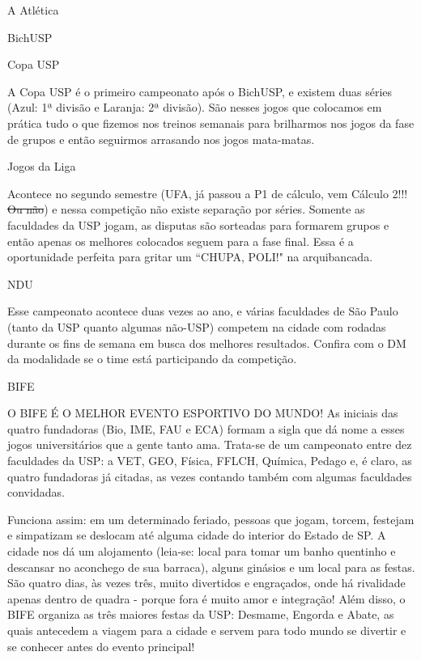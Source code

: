 \begin{secao}{A Atlética}
\begin{subsecao}{BichUSP}
\end{subsecao}
\begin{subsecao}{Copa USP}

A Copa USP é o primeiro campeonato após o BichUSP, e existem duas séries (Azul:
1ª divisão e Laranja: 2ª divisão). São nesses jogos que colocamos em prática
tudo o que fizemos nos treinos semanais para brilharmos nos jogos da fase de
grupos e então seguirmos arrasando nos jogos mata-matas.

\end{subsecao}
\begin{subsecao}{Jogos da Liga}

Acontece no segundo semestre (UFA, já passou a P1 de cálculo, vem Cálculo 2!!!
\sout{Ou não}) e nessa competição não existe separação por séries. Somente as
faculdades da USP jogam, as disputas são sorteadas para formarem grupos e
então apenas os melhores colocados seguem para a fase final. Essa é a
oportunidade perfeita para gritar um ``CHUPA, POLI!" na arquibancada.

\end{subsecao}
\begin{subsecao}{NDU}

Esse campeonato acontece duas vezes ao ano, e várias faculdades de São Paulo
(tanto da USP quanto algumas não-USP) competem na cidade com rodadas durante
os fins de semana em busca dos melhores
resultados. Confira com o DM da modalidade se o time está participando da
competição.

\end{subsecao}
\begin{subsecao}{BIFE}

O BIFE É O MELHOR EVENTO ESPORTIVO DO MUNDO! As iniciais das quatro fundadoras
(Bio, IME, FAU e ECA) formam a sigla que dá nome a esses jogos universitários
que a gente tanto ama. Trata-se de um campeonato entre dez faculdades da USP:
a VET, GEO, Física, FFLCH, Química, Pedago e, é claro, as quatro fundadoras já 
citadas, as vezes contando também com algumas faculdades convidadas.

Funciona assim: em um determinado feriado, pessoas que jogam, torcem, festejam e
simpatizam se deslocam até alguma cidade do interior do Estado de SP. A cidade nos
dá um alojamento (leia-se: local para tomar um banho quentinho e descansar no
aconchego de sua barraca), alguns ginásios e um local para as festas. São
quatro dias, às vezes três, muito divertidos e engraçados, onde há rivalidade 
apenas dentro de quadra - porque fora é muito amor e integração! Além disso,
o BIFE organiza as três maiores festas da USP: Desmame, Engorda e Abate, as
quais antecedem a viagem para a cidade e servem para todo mundo se divertir e
se conhecer antes do evento principal!


\end{subsecao}
\end{secao}
